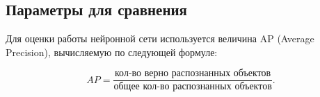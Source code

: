 
\subsection{Параметры для сравнения}

Для оценки работы нейронной сети используется величина AP (Average Precision), вычисляемую по следующей формуле:

\begin{equation}
	AP = \frac{\text{кол-во верно распознанных объектов}}{\text{общее кол-во распознанных объектов}}.
\end{equation}

